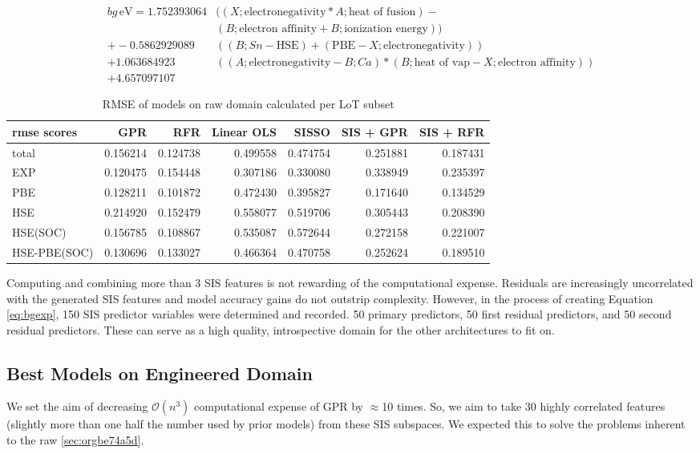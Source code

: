 \begin{align}
\label{eq:bgexp}
bg\,\si{\electronvolt} = 1.752393064 &((X;\mbox{electronegativity}*A;\mbox{heat of fusion})-\nonumber\\&(B;\mbox{electron affinity}+B;\mbox{ionization energy}))\nonumber\\+-0.5862929089 &((B;Sn-\mbox{HSE})+(\mbox{PBE}-X;\mbox{electronegativity}))\nonumber\\+1.063684923 &((A;\mbox{electronegativity}-B;Ca)*(B;\mbox{heat of vap}-X;\mbox{electron affinity}))\nonumber\\+4.657097107
\end{align}

\begin{table}[htbp]
\caption{\label{tbl:LoTscores} RMSE of models on raw domain calculated per LoT subset}
\centering
\begin{tabular}{lrrrrrr}
rmse scores & GPR & RFR & Linear OLS & SISSO & SIS + GPR & SIS + RFR\\[0pt]
\hline
total & 0.156214 & 0.124738 & 0.499558 & 0.474754 & 0.251881 & 0.187431\\[0pt]
EXP & 0.120475 & 0.154448 & 0.307186 & 0.330080 & 0.338949 & 0.235397\\[0pt]
PBE & 0.128211 & 0.101872 & 0.472430 & 0.395827 & 0.171640 & 0.134529\\[0pt]
HSE & 0.214920 & 0.152479 & 0.558077 & 0.519706 & 0.305443 & 0.208390\\[0pt]
HSE(SOC) & 0.156785 & 0.108867 & 0.535087 & 0.572644 & 0.272158 & 0.221007\\[0pt]
HSE-PBE(SOC) & 0.130696 & 0.133027 & 0.466364 & 0.470758 & 0.252624 & 0.189510\\[0pt]
\end{tabular}
\end{table}

Computing and combining more than 3 SIS features is not rewarding of the computational expense.
Residuals are increasingly uncorrelated with the generated SIS features and model accuracy gains do not outstrip complexity.
However, in the process of creating Equation \ref{eq:bgexp}, 150 SIS predictor variables were determined and recorded.
50 primary predictors, 50 first residual predictors, and 50 second residual predictors.
These can serve as a high quality, introspective domain for the other architectures to fit on.

\subsection{Best Models on Engineered Domain}
\label{sec:orgb9d7149}
We set the aim of decreasing \(\mathcal{O}(n^3)\) computational expense of GPR by \(\approx\)10 times.
So, we aim to take 30 highly correlated features (slightly more than one half the number used by prior models) from these SIS subspaces.
We expected this to solve the problems inherent to the raw \ref{sec:orgbe74a5d}.

